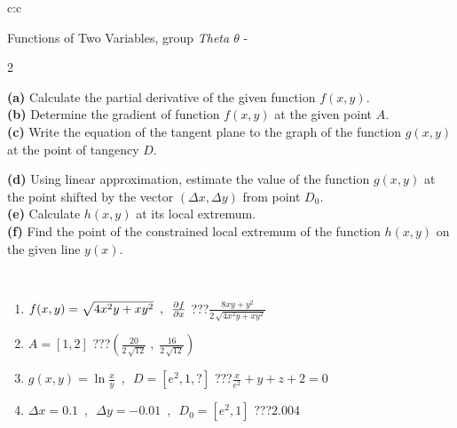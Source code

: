 \documentclass[10pt]{report}
\begin{document}
\begin{tabular}{c:c}
\begin{minipage}[c][104.5mm][t]{0.5\linewidth}
\begin{center}
\vspace{7mm}
{\huge \LARGE Functions of Two Variables, group \textit{Theta $\theta$} -}\\[5mm]
\begin{minipage}{0.95\linewidth}
\begin{center}
{\small \begin{multicols}{2} \raggedright
\textbf{(a)} Calculate the partial derivative of the given function \(f(x,y)\). \\[1mm]
\textbf{(b)} Determine the gradient of function \(f(x,y)\) at the given point \(A\). \\[1mm]
\textbf{(c)} Write the equation of the tangent plane to the graph of the function \(g(x,y)\) at the point of tangency \(D\). \par \columnbreak
\textbf{(d)} Using linear approximation, estimate the value of the function \(g(x,y)\) at the point shifted by the vector \((\Delta x, \Delta y)\) from point \(D_0\). \\[1mm]
\textbf{(e)} Calculate \(h(x,y)\) at its local extremum. \\[1mm]
\textbf{(f)} Find the point of the constrained local extremum of the function \(h(x,y)\) on the given line \(y(x)\). \\[1mm]
\end{multicols}
}
\end{center}
\end{minipage}
\\[4mm]
\begin{minipage}{0.79\linewidth}
\begin{center}
\begin{varwidth}{\linewidth}
\begin{enumerate}
\normalsizerr
\item $f(x,y) = \sqrt{4x^2y + xy^2}\enspace , \enspace \pdv{f}{x}$\quad \dotfill\; ???\;\dotfill \quad $\frac{8xy+y^2}{2\,\sqrt{4x^2y+xy^2}}$
\item $A = [1, 2]$\quad \dotfill\; ???\;\dotfill \quad $\left( \frac{20}{2\,\sqrt{12}} \;,\; \frac{16}{2\,\sqrt{12}} \right)$
\item $g(x,y) = \ln\frac{x}{y} \enspace , \enspace D=[e^{2},1,?]$\quad \dotfill\; ???\;\dotfill \quad $\frac{x}{e^2} + y + z + 2 = 0$
\item $\Delta x = {0.1} \enspace,\enspace \Delta y = {-0.01} \enspace,\enspace D_0 = [e^{2},1]$\quad \dotfill\; ???\;\dotfill \quad $2.004$

\end{enumerate}
\end{varwidth}
\end{center}
\end{minipage}
\end{center}
\end{minipage}
\end{tabular}
\end{document}
